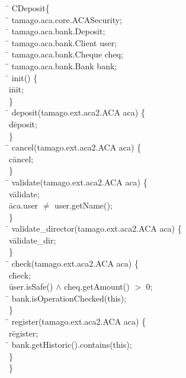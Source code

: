 \begin{program}
\=   CDeposit\{\\
\>  \=    tamago.aca.core.ACASecurity;\\
\>  \=    tamago.aca.bank.Deposit;\\
\>  \=    tamago.aca.bank.Client  user;\\
\>  \=    tamago.aca.bank.Cheque  cheq;\\
\>  \=    tamago.aca.bank.Bank  bank;\\
\>  \=     init() \{\\
\>  \>   i\= nit;\\
\>  \}\\
\>  \=     deposit(tamago.ext.aca2.ACA aca) \{\\
\>  \>   d\= eposit;\\
\>  \}\\
\>  \=     cancel(tamago.ext.aca2.ACA aca) \{\\
\>  \>   c\= ancel;\\
\>  \}\\
\>  \=     validate(tamago.ext.aca2.ACA aca) \{\\
\>  \>   v\= alidate;\\
\>  \>   \= aca.user $\neq$ user.getName();\\
\>  \}\\
\>  \=     validate_director(tamago.ext.aca2.ACA aca) \{\\
\>  \>   v\= alidate_dir;\\
\>  \}\\
\>  \=     check(tamago.ext.aca2.ACA aca) \{\\
\>  \>   c\= heck;\\
\>  \>   \= user.isSafe() $\land$ cheq.getAmount() $>$ 0;\\
\>  \>  \=   bank.isOperationChecked(this);\\
\>  \}\\
\>  \=     register(tamago.ext.aca2.ACA aca) \{\\
\>  \>   r\= egister;\\
\>  \>  \=   bank.getHistoric().contains(this);\\
\>  \}\\
\}
\end{program}